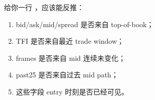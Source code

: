 给你一行 ，应该能反推：

\begin{enumerate}[leftmargin=2em]
  \item bid/ask/mid/spread 是否来自 top-of-book；
  \item TFI 是否来自最近 trade window；
  \item frames 是否来自 mid 连续未变化；
  \item past25 是否来自过去 mid path；
  \item 这些字段 entry 时刻是否已经可见。
\end{enumerate}

